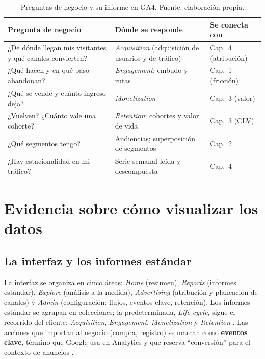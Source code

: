 \begin{table}[!htb]
\centering
\small
\begin{tabular}{@{}p{4.2cm}p{5.4cm}p{2.8cm}@{}}
\toprule
Pregunta de negocio & Dónde se responde & Se conecta con \\
\midrule
¿De dónde llegan mis visitantes y qué canales convierten? & \textit{Acquisition} (adquisición de usuarios y de tráfico) & Cap.~4 (atribución) \\
¿Qué hacen y en qué paso abandonan? & \textit{Engagement}; embudo y rutas & Cap.~1 (fricción) \\
¿Qué se vende y cuánto ingreso deja? & \textit{Monetization} & Cap.~3 (valor) \\
¿Vuelven? ¿Cuánto vale una cohorte? & \textit{Retention}; cohortes y valor de vida & Cap.~3 (CLV) \\
¿Qué segmentos tengo? & Audiencias; superposición de segmentos & Cap.~2 \\
¿Hay estacionalidad en mi tráfico? & Serie semanal leída y descompuesta & Cap.~4 \\
\bottomrule
\end{tabular}
\caption{Preguntas de negocio y su informe en GA4. Fuente: elaboración propia.}
\label{tab:cap05-usos}
\end{table}


\section{Evidencia sobre cómo visualizar los datos}

\subsection{La interfaz y los informes estándar}

La interfaz se organiza en cinco áreas: \textit{Home} (resumen),
\textit{Reports} (informes estándar), \textit{Explore} (análisis a la medida),
\textit{Advertising} (atribución y planeación de canales) y \textit{Admin}
(configuración: flujos, eventos clave, retención). Los informes estándar se
agrupan en colecciones; la predeterminada, \textit{Life cycle}, sigue el
recorrido del cliente: \textit{Acquisition}, \textit{Engagement},
\textit{Monetization} y \textit{Retention} \parencite{google2026ga4informes}.
Las acciones que importan al negocio (compra, registro) se marcan como
\textbf{eventos clave}, término que Google usa en Analytics y que reserva
\enquote{conversión} para el contexto de anuncios \parencite{google2026ga4eventosclave}.

